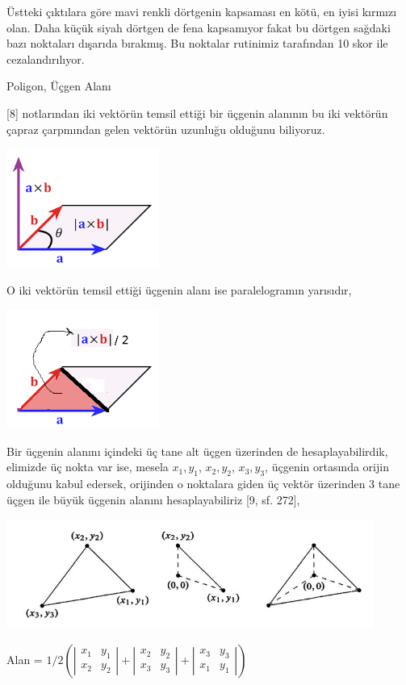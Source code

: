 \documentclass[12pt,fleqn]{article}\usepackage{../../common}
\begin{document}
Üstteki çıktılara göre mavi renkli dörtgenin kapsaması en kötü, en iyisi
kırmızı olan. Daha küçük siyah dörtgen de fena kapsamıyor fakat bu dörtgen
sağdaki bazı noktaları dışarıda bırakmış. Bu noktalar rutinimiz tarafından
10 skor ile cezalandırılıyor.

Poligon, Üçgen Alanı

[8] notlarından iki vektörün temsil ettiği bir üçgenin alanının bu iki vektörün
çapraz çarpmından gelen vektörün uzunluğu olduğunu biliyoruz. 

\includegraphics[width=5cm]{triar4.png}

O iki vektörün temsil ettiği üçgenin alanı ise paralelogramın yarısıdır,

\includegraphics[width=5cm]{triar3.png}

Bir üçgenin alanını içindeki üç tane alt üçgen üzerinden de hesaplayabilirdik,
elimizde üç nokta var ise, mesela $x_1,y_1$, $x_2,y_2$, $x_3,y_3$, üçgenin
ortasında orijin olduğunu kabul edersek, orijinden o noktalara giden üç vektör
üzerinden 3 tane üçgen ile büyük üçgenin alanını hesaplayabiliriz [9, sf. 272],

\includegraphics[width=12cm]{triar5.jpg}

Alan = $1/2 \left( 
\left|\begin{array}{cc}
x_1 & y_1 \\ x_2 & y_2 
\end{array}\right| + 
\left|\begin{array}{cc}
x_2 & y_2 \\ x_3 & y_3 
\end{array}\right| + 
\left|\begin{array}{cc}
x_3 & y_3 \\ x_1 & y_1
\end{array}\right| \right)
$
\end{document}
